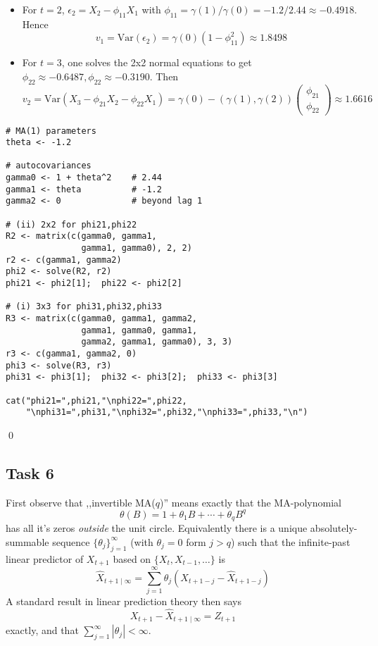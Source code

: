 \documentclass[11pt,a4paper]{article}
\newcommand{\var}{\mathrm{Var}}
\begin{document}
    \begin{itemize}
        \item For $t = 2$, $\epsilon_2 = X_2 - \phi_{11} X_1$ with $\phi_{11} = \gamma(1) / \gamma(0) = -1.2 / 2.44 \approx -0.4918$. Hence \[ v_1 = \var(\epsilon_2) = \gamma(0) \left(1-\phi_{11}^2\right) \approx 1.8498 \]
        \item For $t = 3$, one solves the 2x2 normal equations to get
        $\phi_{22} \approx -0.6487, \phi_{22} \approx -0.3190$. Then
        \[ v_2 = \var(X_3 - \phi_{21} X_2 - \phi_{22} X_1) = \gamma(0) - (\gamma(1),\gamma(2)) \begin{pmatrix} \phi_{21} \\ \phi_{22} \end{pmatrix} \approx 1.6616 \]
    \end{itemize}

    \begin{lstlisting}[style=Rstyle,
                   caption={Solve for \(\phi_{21},\phi_{22}\) and \(\phi_{31},\phi_{32},\phi_{33}\) in R.},
                   label=lst:phicoeff]
# MA(1) parameters
theta <- -1.2

# autocovariances
gamma0 <- 1 + theta^2    # 2.44
gamma1 <- theta          # -1.2
gamma2 <- 0              # beyond lag 1

# (ii) 2x2 for phi21,phi22
R2 <- matrix(c(gamma0, gamma1,
               gamma1, gamma0), 2, 2)
r2 <- c(gamma1, gamma2)
phi2 <- solve(R2, r2)
phi21 <- phi2[1];  phi22 <- phi2[2]

# (i) 3x3 for phi31,phi32,phi33
R3 <- matrix(c(gamma0, gamma1, gamma2,
               gamma1, gamma0, gamma1,
               gamma2, gamma1, gamma0), 3, 3)
r3 <- c(gamma1, gamma2, 0)
phi3 <- solve(R3, r3)
phi31 <- phi3[1];  phi32 <- phi3[2];  phi33 <- phi3[3]

cat("phi21=",phi21,"\nphi22=",phi22,
    "\nphi31=",phi31,"\nphi32=",phi32,"\nphi33=",phi33,"\n")
\end{lstlisting} \qed

    \subsection*{Task 6}
    First observe that ,,invertible MA($q$)'' means exactly that the MA-polynomial
    \[ \theta(B) = 1 + \theta_1 B + \cdots + \theta_q B^q \]
    has all it's zeros \emph{outside} the unit circle. Equivalently there is a unique absolutely-summable sequence $\{\theta_j\}_{j=1}^\infty$ (with $\theta_j = 0$ form $j > q$) such that the infinite-past linear predictor of $X_{t+1}$ based on $\{X_t, X_{t-1}, \ldots \}$ is \[ \hat X_{t+1 \mid \infty} = \sum_{j=1}^\infty \theta_j (X_{t+1-j} - \hat X_{t+1-j}) \]
    A standard result in linear prediction theory then says
    \[ X_{t+1} - \hat X_{t+1 \mid \infty} = Z_{t+1} \]
    exactly, and that $\sum_{j=1}^\infty |\theta_j| < \infty$.
\end{document}

